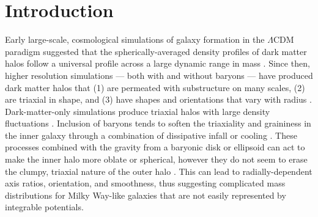 \documentclass[letterpaper,12pt,preprint]{aastex}
\begin{document}

\section{Introduction}

Early large-scale, cosmological simulations of galaxy formation in the $\Lambda$CDM paradigm suggested that the spherically-averaged density profiles of dark matter halos follow a universal profile across a large dynamic range in mass \citep{navarro96}. Since then, higher resolution simulations --- both with and without baryons --- have produced dark matter halos that (1) are permeated with substructure on many scales, (2) are triaxial in shape, and (3) have shapes and orientations that vary with radius \citep{dubinski91, jing02, kuhlen07, veraciro11}. Dark-matter-only simulations produce triaxial halos \citep{jing02} with large density fluctuations \citep{zemp09}. Inclusion of baryons tends to soften the triaxiality and graininess in the inner galaxy through a combination of dissipative infall \citep{dubinski94} or cooling \citep{bryan13}. These processes combined with the gravity from a baryonic disk or ellipsoid can act to make the inner halo more oblate or spherical, however they do not seem to erase the clumpy, triaxial nature of the outer halo \citep[e.g.,][]{pontzen12}. This can lead to radially-dependent axis ratios, orientation, and smoothness, thus suggesting complicated mass distributions for Milky Way-like galaxies that are not easily represented by integrable potentials.
\end{document}
